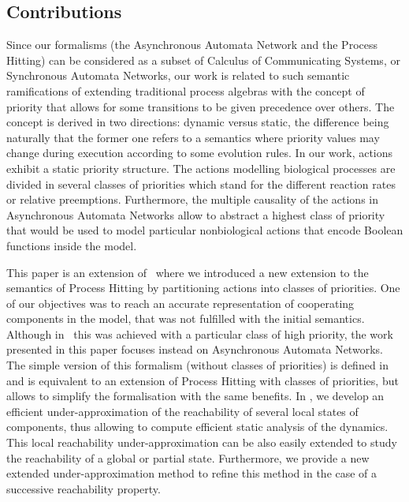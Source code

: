 \subsection*{Contributions}
Since our formalisms (the Asynchronous Automata Network and the Process Hitting)
can be considered as a subset of Calculus of Communicating Systems,
or Synchronous Automata Networks,
our work is related to such semantic ramifications of extending traditional process algebras with the concept of priority that allows for some transitions to be given precedence over others.
The concept is derived in two directions: dynamic versus static, the difference being naturally that the former one refers to a semantics where priority values may change during execution according to some evolution rules.
In our work, actions exhibit a static priority structure.
The actions modelling biological processes are divided in several classes of priorities which stand for the different reaction rates or relative preemptions.
Furthermore, the multiple causality of the actions in Asynchronous Automata Networks
allow to abstract a highest class of priority that would be used
to model particular nonbiological actions
that encode Boolean functions inside the model.

This paper is an extension of~\cite{FPMR13-CS2Bio} where we
introduced a new extension to the semantics of Process Hitting
by partitioning actions into classes of priorities.
One of our objectives was to reach an accurate representation of cooperating components in the model, that was not fulfilled with the initial semantics.
Although in~\cite{FPMR13-CS2Bio} this was achieved with a particular class of high priority,
the work presented in this paper focuses instead on Asynchronous Automata Networks.
The simple version of this formalism (without classes of priorities)
is defined in 
and is equivalent to an extension of Process Hitting with classes of priorities,
but allows to simplify the formalisation with the same benefits.
In ,
we develop an efficient under-approximation of the reachability
of several local states of components,
thus allowing to compute efficient static analysis of the dynamics.
This local reachability under-approximation can be also easily extended to study the reachability of a global or partial state.
Furthermore, we provide a new extended under-approximation method to refine this method
in the case of a successive reachability property.

